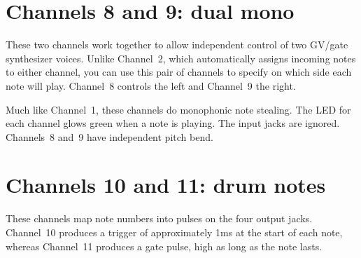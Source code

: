 
\section{Channels 8 and 9:  dual mono}

These two channels work together to allow independent control of two GV/gate
synthesizer voices.  Unlike Channel~2, which automatically assigns incoming
notes to either channel, you can use this pair of channels to specify on
which side each note will play.  Channel~8 controls the left and Channel~9
the right.

{\centering
{}\par}

Much like Channel~1, these channels do monophonic note stealing.  The
LED for each channel glows green when a note is playing.  The input jacks
are ignored.  Channels~8 and~9 have independent pitch bend.


\section{Channels 10 and 11:  drum notes}

These channels map note numbers into pulses on the four output jacks. 
Channel~10 produces a trigger of approximately 1ms at the start of each
note, whereas Channel~11 produces a gate pulse, high as long as the note
lasts.

